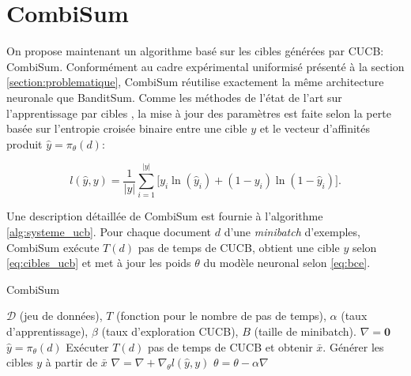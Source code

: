 \section{CombiSum}
\label{sec:combisum}

On propose maintenant un algorithme basé sur les cibles 
générées par CUCB: CombiSum.
Conformément au cadre expérimental uniformisé présenté à la section 
\ref{section:problematique},
CombiSum réutilise exactement la même architecture neuronale que BanditSum.
Comme les méthodes de l'état de l'art sur l'apprentissage 
par cibles \citep{liu2019text}, la mise à jour des paramètres est faite selon la 
perte basée sur l'entropie croisée binaire entre une cible $y$
et le vecteur d'affinités produit $\hat{y} = \pi_\theta(d)$:

\begin{equation}
    l(\hat{y}, y) = \frac{1}{|y|} \sum_{i=1}^{|y|}\big[y_i \ln(\hat{y}_i) + (1 - y_i) \ln(1 - \hat{y}_i) \big].
    \label{eq:bce}
\end{equation}

Une description détaillée de CombiSum est fournie à l'algorithme \ref{alg:systeme_ucb}.
Pour chaque document $d$ d'une \textit{minibatch} d'exemples, CombiSum exécute 
$T(d)$ pas de temps de CUCB, obtient une cible $y$ selon \eqref{eq:cibles_ucb}
et met à jour les poids $\theta$ du modèle neuronal selon \eqref{eq:bce}.

\begin{algorithm}
    \caption{CombiSum}
    \begin{algorithmic}[1]
        \Require  $\mathcal{D}$ (jeu de données), $T$ (fonction pour le nombre de pas de temps), $\alpha$ (taux d'apprentissage), $\beta$ (taux d'exploration CUCB), $B$ (taille de minibatch).
         
        \State $\nabla = \mathbf{0}$
        \State $\hat{y} = \pi_\theta(d)$
        \State Exécuter $T(d)$ pas de temps de CUCB et obtenir $\bar{x}$.
        \State Générer les cibles $y$ à partir de $\bar{x}$ 
        \State $\nabla = \nabla + \nabla_\theta l(\hat{y}, y)$ 
        \EndFor
        \State $\theta = \theta - \alpha \nabla$
        \EndWhile
    \end{algorithmic}
    \label{alg:systeme_ucb}
\end{algorithm}

